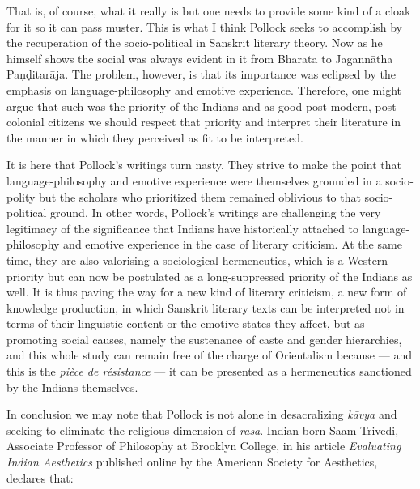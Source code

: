 That is, of course, what it really is but one needs to provide some kind of a cloak for it so it can pass muster. This is what I think Pollock seeks to accomplish by the recuperation of the socio-political in Sanskrit literary theory. Now as he himself shows the social was always evident in it from Bharata to Jagannātha Paṇḍitarāja. The problem, however, is that its importance was eclipsed by the emphasis on language-philosophy and emotive experience. Therefore, one might argue that such was the priority of the Indians and as good post-modern, post-colonial citizens we should respect that priority and interpret their literature in the manner in which they perceived as fit to be interpreted. 

It is here that Pollock's writings turn nasty. They strive to make the point that language-philosophy and emotive experience were themselves grounded in a socio-polity but the scholars who prioritized them remained oblivious to that socio-political ground. In other words, Pollock's writings are challenging the very legitimacy of the significance that Indians have historically attached to language-philosophy and emotive experience in the case of literary criticism. At the same time, they are also valorising a sociological hermeneutics, which is a Western priority but can now be postulated as a long-suppressed priority of the Indians as well. It is thus paving the way for a new kind of literary criticism, a new form of knowledge production, in which Sanskrit literary texts can be interpreted not in terms of their linguistic content or the emotive states they affect, but as promoting social causes, namely the sustenance of caste and gender hierarchies, and this whole study can remain free of the charge of Orientalism because --- and this is the \textsl{pièce de résistance} --- it can be presented as a hermeneutics sanctioned by the Indians themselves.
\vskip 2pt

In conclusion we may note that Pollock is not alone in desacralizing \textsl{kāvya} and seeking to eliminate the religious dimension of \textsl{rasa}. Indian-born Saam Trivedi, Associate Professor of Philosophy at Brooklyn College, in his article \textsl{Evaluating Indian Aesthetics} published online by the American Society for Aesthetics, declares that:
\smallskip

